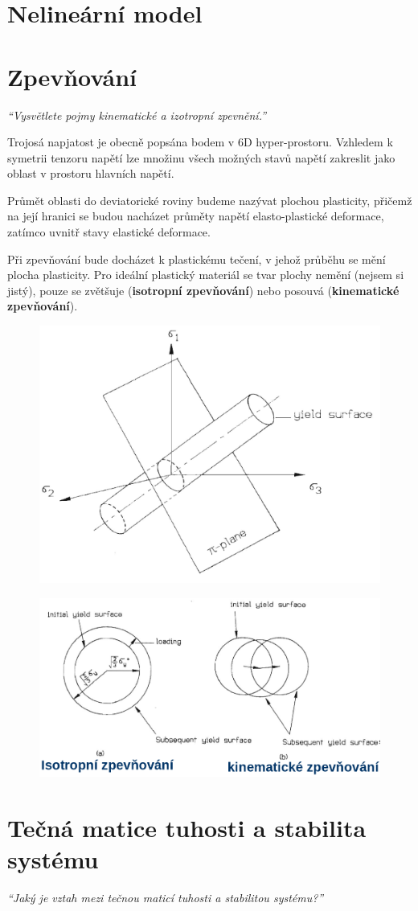 \documentclass{article}
\begin{document}
	\section{Nelineární model}

	\section{Zpevňování}
	\emph{``Vysvětlete pojmy kinematické a izotropní zpevnění.''}

	Trojosá napjatost je obecně popsána bodem v 6D hyper-prostoru. Vzhledem k symetrii tenzoru napětí lze množinu všech možných stavů napětí zakreslit jako oblast v prostoru hlavních napětí.

	Průmět oblasti do deviatorické roviny budeme nazývat plochou plasticity, přičemž na její hranici se budou nacházet průměty napětí elasto-plastické deformace, zatímco uvnitř stavy elastické deformace.

	Při zpevňování bude docházet k plastickému tečení, v jehož průběhu se mění plocha plasticity. Pro ideální plastický materiál se tvar plochy nemění (nejsem si jistý), pouze se zvětšuje (\textbf{isotropní zpevňování}) nebo posouvá (\textbf{kinematické zpevňování}).
	\begin{figure}[h!]
		\centering
		\includegraphics[width=.5\linewidth]{figs/PlochaPlasticity.png}
	\end{figure}
	\begin{figure}[h!]
		\centering
		\includegraphics[width=.5\linewidth]{figs/Zpevnovani.png}
	\end{figure}

	\section{Tečná matice tuhosti a stabilita systému}
	\emph{``Jaký je vztah mezi tečnou maticí tuhosti a stabilitou systému?''}
\end{document}
